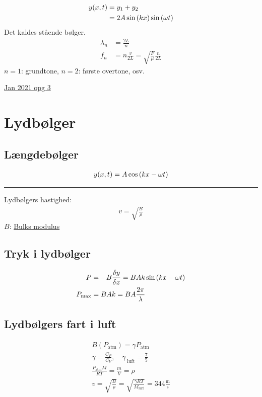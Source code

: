 \documentclass[a4paper,oneside,article]{memoir}
\begin{document}
\begin{align*}
    y(x,t)&=y_1+y_2 \\
    &= 2A\sin\br{kx}\sin\br{\omega t}
\end{align*}
Det kaldes stående bølger. 
\begin{align*}
    \lambda_n &= \frac{2L}{n} \\
    f_n &= n\frac{v}{2L} = \sqrt{\frac{F}{\mu}}\frac{n}{2L}
\end{align*}
$n=1$: grundtone, $n=2$: første overtone, osv.

\hyperref[asc:Jan 2021 opg 3]{Jan 2021 opg 3}

\section{Lydbølger} \label{sc:lydbølger}
\subsection{Længdebølger} \label{ssc:længdebølger}
\begin{align*}
    y(x,t) = A\cos\br{kx-\omega t} \\
\end{align*}
\plainbreak{2}
Lydbølgers hastighed: 
\begin{align*}
    v = \sqrt{\frac{B}{\rho}}
\end{align*}
$B$: \hyperref[fig:youngsmodulus]{Bulks modulus}

\subsection{Tryk i lydbølger} \label{ssc:tryklyd}
\begin{align*}
    P &= -B\frac{\delta y}{\delta x} = BAk\sin\br{kx-\omega t} \\
    P_\text{max} &= BAk=BA\frac{2\pi}{\lambda}
\end{align*}

\subsection{Lydbølgers fart i luft}
\begin{align*}
    B(P_\text{atm})=\gamma P_\text{atm} \\
    \gamma = \frac{C_P}{C_V}, \quad \gamma_{\;\text{luft}} = \frac{7}{5} \\
    \frac{P_\text{atm}M}{RT} = \frac{m}{V} = \rho \\
    v = \sqrt{\frac{B}{\rho}} = \sqrt{\frac{\gamma RT}{M_\text{luft}}} = 344 \frac{\text{m}}{\text{s}}
\end{align*}
\end{document}
